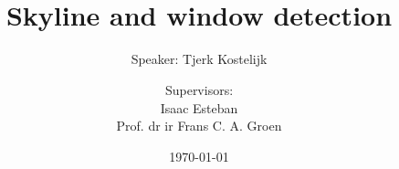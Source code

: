 \documentclass{beamer}
\title{\LARGE \sc{Semantic annotation of urban scenes:}\\Skyline and window detection}
\subtitle{Speaker: Tjerk Kostelijk}
\author{Supervisors: \\Isaac Esteban\\Prof. dr ir Frans C. A. Groen}
\date{\today}
\begin{document}


\frame{\titlepage}
\end{document}
